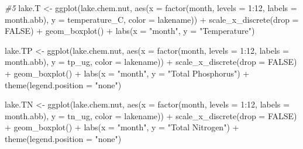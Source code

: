 \documentclass[
]{article}
\newenvironment{Shaded}{\begin{snugshade}}{\end{snugshade}}
\newcommand{\AttributeTok}[1]{\textcolor[rgb]{0.77,0.63,0.00}{#1}}
\newcommand{\CommentTok}[1]{\textcolor[rgb]{0.56,0.35,0.01}{\textit{#1}}}
\newcommand{\ConstantTok}[1]{\textcolor[rgb]{0.00,0.00,0.00}{#1}}
\newcommand{\DecValTok}[1]{\textcolor[rgb]{0.00,0.00,0.81}{#1}}
\newcommand{\FunctionTok}[1]{\textcolor[rgb]{0.00,0.00,0.00}{#1}}
\newcommand{\NormalTok}[1]{#1}
\newcommand{\OtherTok}[1]{\textcolor[rgb]{0.56,0.35,0.01}{#1}}
\newcommand{\SpecialCharTok}[1]{\textcolor[rgb]{0.00,0.00,0.00}{#1}}
\newcommand{\StringTok}[1]{\textcolor[rgb]{0.31,0.60,0.02}{#1}}
\begin{document}
\begin{Shaded}
\begin{Highlighting}[]
\CommentTok{\#5 }
\NormalTok{lake.T }\OtherTok{\textless{}{-}} \FunctionTok{ggplot}\NormalTok{(lake.chem.nut, }
                 \FunctionTok{aes}\NormalTok{(}\AttributeTok{x =} \FunctionTok{factor}\NormalTok{(month, }\AttributeTok{levels =} \DecValTok{1}\SpecialCharTok{:}\DecValTok{12}\NormalTok{, }\AttributeTok{labels =}\NormalTok{ month.abb), }
                     \AttributeTok{y =}\NormalTok{ temperature\_C, }\AttributeTok{color =}\NormalTok{ lakename)) }\SpecialCharTok{+}
  \FunctionTok{scale\_x\_discrete}\NormalTok{(}\AttributeTok{drop =} \ConstantTok{FALSE}\NormalTok{) }\SpecialCharTok{+}
  \FunctionTok{geom\_boxplot}\NormalTok{() }\SpecialCharTok{+}
  \FunctionTok{labs}\NormalTok{(}\AttributeTok{x =} \StringTok{"month"}\NormalTok{, }\AttributeTok{y =} \StringTok{"Temperature"}\NormalTok{)}

\NormalTok{lake.TP }\OtherTok{\textless{}{-}} \FunctionTok{ggplot}\NormalTok{(lake.chem.nut, }
                 \FunctionTok{aes}\NormalTok{(}\AttributeTok{x =} \FunctionTok{factor}\NormalTok{(month, }\AttributeTok{levels =} \DecValTok{1}\SpecialCharTok{:}\DecValTok{12}\NormalTok{, }\AttributeTok{labels =}\NormalTok{ month.abb), }
                     \AttributeTok{y =}\NormalTok{ tp\_ug, }\AttributeTok{color =}\NormalTok{ lakename)) }\SpecialCharTok{+}
  \FunctionTok{scale\_x\_discrete}\NormalTok{(}\AttributeTok{drop =} \ConstantTok{FALSE}\NormalTok{) }\SpecialCharTok{+}
  \FunctionTok{geom\_boxplot}\NormalTok{() }\SpecialCharTok{+}
  \FunctionTok{labs}\NormalTok{(}\AttributeTok{x =} \StringTok{"month"}\NormalTok{, }\AttributeTok{y =} \StringTok{"Total Phosphorus"}\NormalTok{) }\SpecialCharTok{+}
  \FunctionTok{theme}\NormalTok{(}\AttributeTok{legend.position =} \StringTok{"none"}\NormalTok{)}

\NormalTok{lake.TN }\OtherTok{\textless{}{-}} \FunctionTok{ggplot}\NormalTok{(lake.chem.nut, }
                 \FunctionTok{aes}\NormalTok{(}\AttributeTok{x =} \FunctionTok{factor}\NormalTok{(month, }\AttributeTok{levels =} \DecValTok{1}\SpecialCharTok{:}\DecValTok{12}\NormalTok{, }\AttributeTok{labels =}\NormalTok{ month.abb), }
                     \AttributeTok{y =}\NormalTok{ tn\_ug, }\AttributeTok{color =}\NormalTok{ lakename)) }\SpecialCharTok{+}
  \FunctionTok{scale\_x\_discrete}\NormalTok{(}\AttributeTok{drop =} \ConstantTok{FALSE}\NormalTok{) }\SpecialCharTok{+}
  \FunctionTok{geom\_boxplot}\NormalTok{() }\SpecialCharTok{+}
  \FunctionTok{labs}\NormalTok{(}\AttributeTok{x =} \StringTok{"month"}\NormalTok{, }\AttributeTok{y =} \StringTok{"Total Nitrogen"}\NormalTok{) }\SpecialCharTok{+}
  \FunctionTok{theme}\NormalTok{(}\AttributeTok{legend.position =} \StringTok{"none"}\NormalTok{)}


\end{Highlighting}
\end{Shaded}
\end{document}
